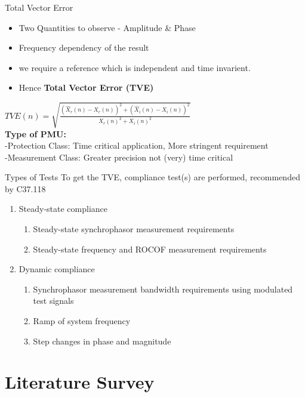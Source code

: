 \documentclass{beamer}
\begin{document}
   
   \begin{frame}{Total Vector Error}

	\begin{itemize}
	\item Two Quantities to observe - Amplitude \& Phase
	\item Frequency dependency of the result
	\item we require a reference which is  independent and time invarient.
	\item Hence \textbf{Total Vector Error (TVE)} %
	\end{itemize}
	$ TVE(n) = \sqrt{\frac{ (\hat{X}_r(n) - X_r(n))^2 + (\hat{X}_i(n)-X_i(n))^2} {X_r(n)^2 + X_i(n)^2}} $ \\
\vspace{5pt}
 \textbf{Type of PMU:}\\
 -Protection  Class: Time critical application, More stringent requirement \\ 
 -Measurement Class: Greater precision not (very) time critical 
   \end{frame}
\begin{frame}{Types of Tests}
To get the TVE, compliance test(s) are performed, recommended by C37.118
\begin{enumerate}
\item Steady-state compliance
	\begin{enumerate}
	\item Steady-state synchrophasor measurement requirements
	\item Steady-state frequency and ROCOF measurement requirements
	\end{enumerate}
\item Dynamic compliance
	\begin{enumerate}
	\item Synchrophasor measurement bandwidth requirements using modulated test signals
	\item Ramp of system frequency
	\item Step changes in phase and magnitude
	\end{enumerate}
\end{enumerate} 

\end{frame}

\section{Literature Survey}
\end{document}
